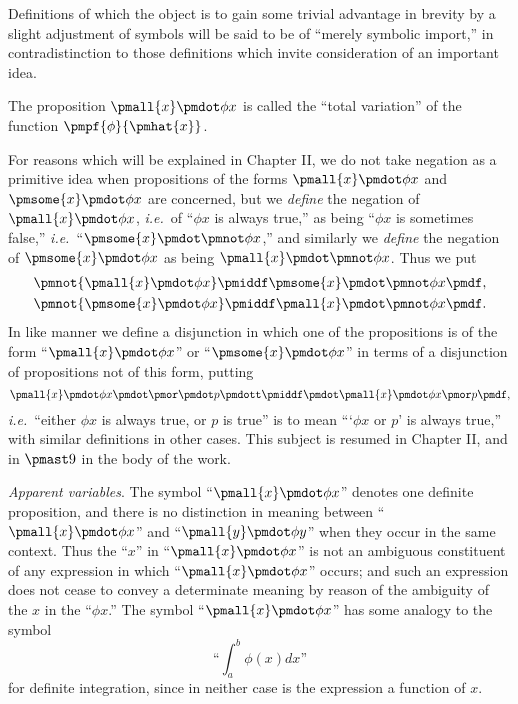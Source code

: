 \documentclass[letterpaper,12pt,openany,leqno]{book}
\newcommand{\pagefirst}[1]{\marginnote[\boxed{\text{#1}}]{\boxed{\text{#1}}}}
\begin{document}
Definitions of which the object is to gain some trivial advantage in brevity by a slight adjustment of symbols will be said to be of ``merely symbolic import,'' in contradistinction to those definitions which invite consideration of an important idea.

The proposition $\pmall{x}\pmdot \phi x$ is called the ``total variation'' of the function $\pmpf{\phi}{\pmhat{x}}$.

For reasons which will be explained in Chapter II, we do not take negation as a primitive idea when propositions of the forms $\pmall{x}\pmdot \phi x$ and $\pmsome{x}\pmdot \phi x$ are concerned, but we \textit{define} the negation of $\pmall{x}\pmdot \phi x$, \textit{i.e.}\ of ``$\phi x$ is always true,'' as being ``$\phi x$ is sometimes false,'' \textit{i.e.}\ ``$\pmsome{x}\pmdot \pmnot \phi x$,'' and similarly we \textit{define} the negation of $\pmsome{x}\pmdot \phi x$ as being $\pmall{x}\pmdot \pmnot \phi x$. Thus we put
\begin{align*}
	\pmnot \{\pmall{x}\pmdot\phi x \} \pmiddf \pmsome{x}\pmdot \pmnot \phi x \pmdf, \\
	\pmnot \{\pmsome{x}\pmdot\phi x \} \pmiddf \pmall{x}\pmdot \pmnot \phi  x \pmdf.
\end{align*}
In like manner we define a disjunction in which one of the propositions is of the form ``$\pmall{x}\pmdot \phi x$'' or ``$\pmsome{x}\pmdot \phi x$'' in terms of a disjunction of propositions not of this form, putting \[
	\pmall{x}\pmdot \phi x \pmdot \pmor \pmdot p \pmdott \pmiddf \pmdot \pmall{x}\pmdot \phi x\pmor p \pmdf,
\]
\pagefirst{17} \textit{i.e.}\ ``either $\phi x$ is always true, or $p$ is true'' is to mean ```$\phi x$ or $p$' is always true,'' with similar definitions in other cases. This subject is resumed in Chapter II, and in $\pmast9$ in the body of the work.

\textit{Apparent variables}. The symbol ``$\pmall{x}\pmdot \phi x$'' denotes one definite proposition, and there is no distinction in meaning between ``$\pmall{x}\pmdot \phi x$'' and ``$\pmall{y}\pmdot \phi y$'' when they occur in the same context. Thus the ``$x$'' in ``$\pmall{x}\pmdot \phi x$'' is not an ambiguous constituent of any expression in which ``$\pmall{x}\pmdot \phi x$'' occurs; and such an expression does not cease to convey a determinate meaning by reason of the ambiguity of the $x$ in the ``$\phi x$.'' The symbol ``$\pmall{x}\pmdot \phi x$'' has some analogy to the symbol
\[
	\text{``}\int_a^b \phi(x)dx\text{''}
\]
for definite integration, since in neither case is the expression a function of $x$.
\end{document}
